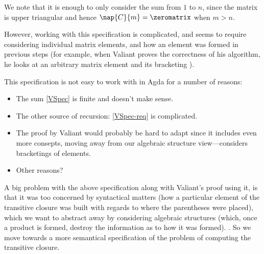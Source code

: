 We note that it is enough to only consider the sum from $1$ to $n$, since the matrix is upper triangular and hence $\nap{C}{m} = \zeromatrix$ when $m > n$.

However, working with this specification is complicated, and seems to require considering individual matrix elements, and how an element was formed in previous steps (for example, when Valiant proves the correctness of his algorithm, he looks at an arbitrary matrix element and its bracketing \cite{Valiant} ). 

This specification is not easy to work with in Agda for a number of reasons:
\begin{itemize}
\item The sum \eqref{VSpec} is finite and doesn't make sense.
\item The other source of recursion: \eqref{VSpec-req} is complicated.
\item The proof by Valiant would probably be hard to adapt since it includes even more consepts, moving away from our algebraic structure view---considers bracketings of elements.
\item Other reasons?
\end{itemize}

A big problem with the above specification along with Valiant's proof using it, is that it was too concerned by syntactical matters (how a particular element of the transitive closure was built with regards to where the parentheses were placed), which we want to abstract away by considering algebraic structures (which, once a product is formed, destroy the information as to how it was formed). . So we move towards a more semantical specification of the problem of computing the transitive closure.

